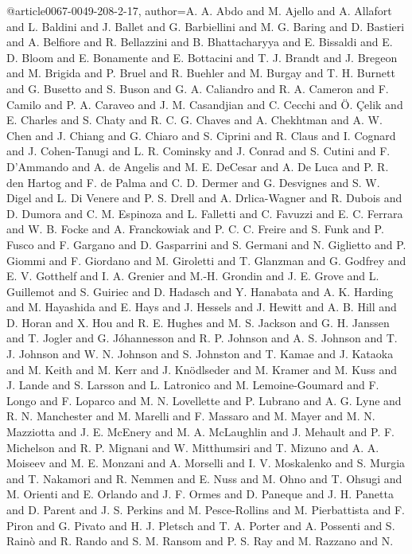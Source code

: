 {	
@article{0067-0049-208-2-17,
  author={A. A. Abdo and M. Ajello and A. Allafort and L. Baldini and J. Ballet and G. Barbiellini and M. G. Baring and D. Bastieri and A.
Belfiore and R. Bellazzini and B. Bhattacharyya and E. Bissaldi and E. D. Bloom and E. Bonamente and E. Bottacini and T. J.
Brandt and J. Bregeon and M. Brigida and P. Bruel and R. Buehler and M. Burgay and T. H. Burnett and G. Busetto and S. Buson and G. A.
Caliandro and R. A. Cameron and F. Camilo and P. A. Caraveo and J. M. Casandjian and C. Cecchi and Ö. Çelik and E. Charles and S.
Chaty and R. C. G. Chaves and A. Chekhtman and A. W. Chen and J. Chiang and G. Chiaro and S. Ciprini and R. Claus and I. Cognard and J.
Cohen-Tanugi and L. R. Cominsky and J. Conrad and S. Cutini and F. D'Ammando and A. de Angelis and M. E. DeCesar and A. De
Luca and P. R. den Hartog and F. de Palma and C. D. Dermer and G. Desvignes and S. W. Digel and L. Di Venere and P. S. Drell and A.
Drlica-Wagner and R. Dubois and D. Dumora and C. M. Espinoza and L. Falletti and C. Favuzzi and E. C. Ferrara and W. B. Focke and A.
Franckowiak and P. C. C. Freire and S. Funk and P. Fusco and F. Gargano and D. Gasparrini and S. Germani and N. Giglietto and P.
Giommi and F. Giordano and M. Giroletti and T. Glanzman and G. Godfrey and E. V. Gotthelf and I. A. Grenier and M.-H. Grondin and J.
E. Grove and L. Guillemot and S. Guiriec and D. Hadasch and Y. Hanabata and A. K. Harding and M. Hayashida and E. Hays and J.
Hessels and J. Hewitt and A. B. Hill and D. Horan and X. Hou and R. E. Hughes and M. S. Jackson and G. H. Janssen and T. Jogler and G.
Jóhannesson and R. P. Johnson and A. S. Johnson and T. J. Johnson and W. N. Johnson and S. Johnston and T. Kamae and J.
Kataoka and M. Keith and M. Kerr and J. Knödlseder and M. Kramer and M. Kuss and J. Lande and S. Larsson and L. Latronico and M.
Lemoine-Goumard and F. Longo and F. Loparco and M. N. Lovellette and P. Lubrano and A. G. Lyne and R. N. Manchester and M.
Marelli and F. Massaro and M. Mayer and M. N. Mazziotta and J. E. McEnery and M. A. McLaughlin and J. Mehault and P. F.
Michelson and R. P. Mignani and W. Mitthumsiri and T. Mizuno and A. A. Moiseev and M. E. Monzani and A. Morselli and I. V.
Moskalenko and S. Murgia and T. Nakamori and R. Nemmen and E. Nuss and M. Ohno and T. Ohsugi and M. Orienti and E. Orlando and J. F.
Ormes and D. Paneque and J. H. Panetta and D. Parent and J. S. Perkins and M. Pesce-Rollins and M. Pierbattista and F. Piron and G.
Pivato and H. J. Pletsch and T. A. Porter and A. Possenti and S. Rainò and R. Rando and S. M. Ransom and P. S. Ray and M. Razzano and N.
}}}
